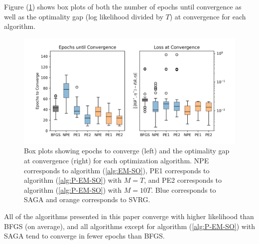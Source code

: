 Figure (\ref{fig:boxplots_case}) shows box plots of both the number of epochs until convergence as well as the optimality gap (log likelihood divided by $T$) at convergence for each algorithm.
%
\begin{figure}
    \centering
    \includegraphics[width=6.5in]{../plt/boxplots_case_study.png}
    \caption{Box plots showing epochs to converge (left) and the optimality gap at convergence (right) for each optimization algorithm. NPE corresponds to algorithm (\ref{alg:EM-SO}), PE1 corresponds to algorithm (\ref{alg:P-EM-SO}) with $M=T$, and PE2 corresponds to algorithm (\ref{alg:P-EM-SO}) with $M=10T$. Blue corresponds to SAGA and orange corresponds to SVRG.}
    \label{fig:boxplots_case}
\end{figure}
%
All of the algorithms presented in this paper converge with higher likelihood than BFGS (on average), and all algorithms except for algorithm (\ref{alg:P-EM-SO}) with SAGA tend to converge in fewer epochs than BFGS.

